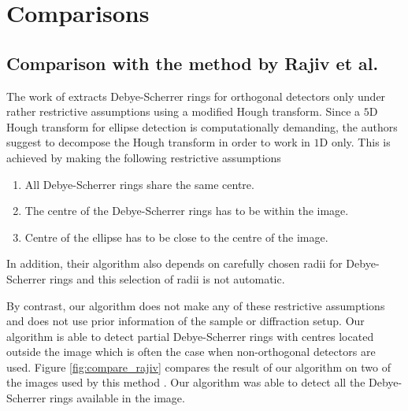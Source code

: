 \documentclass[preprint]{iucr}              %
\newcommand\dsrs{Debye-Scherrer rings}
\begin{document}
\section{Comparisons}
\label{sec:compr}
\subsection{\textbf{Comparison with the method by Rajiv et al.}}
\label{sec:rajiv}
{The work of \cite{PDJ:8503397} extracts \dsrs{} for orthogonal detectors only
under rather restrictive assumptions using a modified Hough transform. 
Since a $5$D Hough transform for ellipse detection is computationally demanding,
the authors suggest to decompose the Hough transform in order to work in $1$D only. 
This is achieved by making the following restrictive assumptions
\begin{enumerate}
    \item All {\dsrs} share the same centre.
    \item The centre of the {\dsrs} has to be within the image.
    \item Centre of the ellipse has to be close to the centre of the image.
\end{enumerate}
In addition, their algorithm also depends on carefully chosen radii for \dsrs{}
and this selection of radii is not automatic. 
}

{By contrast, our algorithm does not make any of these restrictive assumptions
and does not use prior information of the sample or diffraction setup. 
Our algorithm is able to detect partial \dsrs{} with centres located outside the
image which is often the case when non-orthogonal detectors are used. 
Figure \ref{fig:compare_rajiv} compares the result of our algorithm on two of
the images used by this method \cite{PDJ:8503397}. 
Our algorithm was able to detect all the {\dsrs} available in the image.
}
\end{document}
